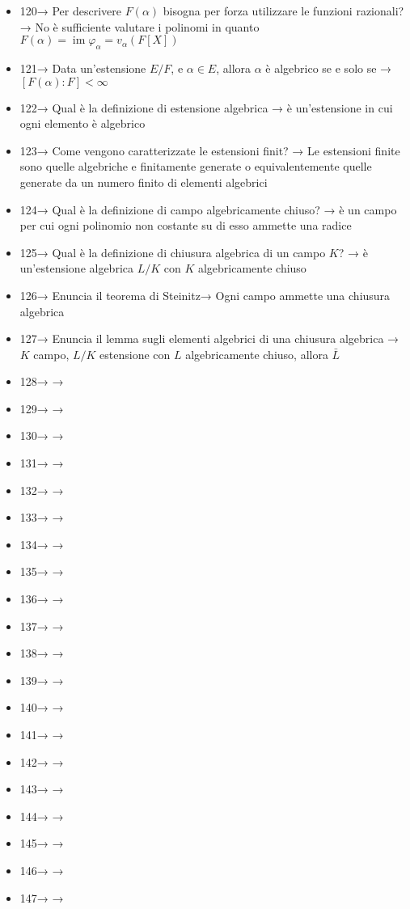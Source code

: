 \documentclass[A4,12pt]{article}
\begin{document}
\begin{itemize}[noitemsep]
		\item 120→ Per descrivere $ F(\alpha) $ bisogna per forza utilizzare le funzioni razionali? → No è sufficiente valutare i polinomi in quanto $ F(\alpha) = \operatorname{im} \varphi_\alpha = v_\alpha (F[X])$
		\item 121→ Data un'estensione $E/F$, e $\alpha \in E$, allora $\alpha $ è algebrico se e solo se → $[F(\alpha):F]<\infty$ 
		\item 122→ Qual è la definizione di estensione algebrica → è un'estensione in cui ogni elemento è algebrico
		\item 123→ Come vengono caratterizzate le estensioni finit? → Le estensioni finite sono quelle algebriche e finitamente generate o equivalentemente quelle generate da un numero finito di elementi algebrici
		\item 124→ Qual è la definizione di campo algebricamente chiuso? → è un campo per cui ogni polinomio non costante su di esso ammette una radice
		\item 125→ Qual è la definizione di chiusura algebrica di un campo $K$? → è un'estensione algebrica $L/K$ con $K$ algebricamente chiuso
		\item 126→ Enuncia il teorema di Steinitz→ Ogni campo ammette una chiusura algebrica
		\item 127→ Enuncia il lemma sugli elementi algebrici di una chiusura algebrica → $K$ campo, $L/K$ estensione con $L$ algebricamente chiuso, allora $\bar L$
		\item 128→ →
		\item 129→ →
		\item 130→ →
		\item 131→ →
		\item 132→ →
		\item 133→ →
		\item 134→ →
		\item 135→ →
		\item 136→ →
		\item 137→ →
		\item 138→ →
		\item 139→ →
		\item 140→ →
		\item 141→ →
		\item 142→ →
		\item 143→ →
		\item 144→ →
		\item 145→ →
		\item 146→ →
		\item 147→ →

\end{itemize}
\end{document}
